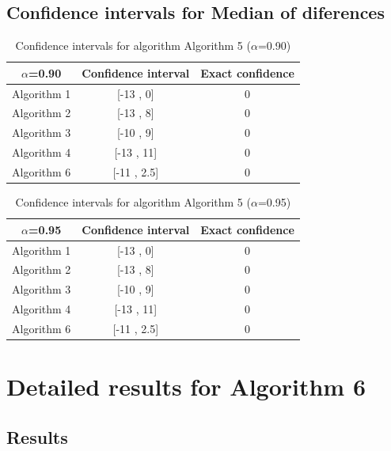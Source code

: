 \documentclass[a4paper,10pt]{article}
\begin{document}
\subsection{Confidence intervals for Median of diferences}

\begin{table}[!htp]
\centering\small
\begin{tabular}{
|c|c|c|}
\hline
 $\alpha$=0.90 & Confidence interval & Exact confidence \\ \hline 
Algorithm 1 & [-13 , 0] & 0\\ \hline 
Algorithm 2 & [-13 , 8] & 0\\ \hline 
Algorithm 3 & [-10 , 9] & 0\\ \hline 
Algorithm 4 & [-13 , 11] & 0\\ \hline 
Algorithm 6 & [-11 , 2.5] & 0\\ \hline 

\end{tabular}
\caption{Confidence intervals for algorithm Algorithm 5 ($\alpha$=0.90)}
\end{table}
\begin{table}[!htp]
\centering\small
\begin{tabular}{
|c|c|c|}
\hline
 $\alpha$=0.95 & Confidence interval & Exact confidence \\ \hline 
Algorithm 1 & [-13 , 0] & 0\\ \hline 
Algorithm 2 & [-13 , 8] & 0\\ \hline 
Algorithm 3 & [-10 , 9] & 0\\ \hline 
Algorithm 4 & [-13 , 11] & 0\\ \hline 
Algorithm 6 & [-11 , 2.5] & 0\\ \hline 

\end{tabular}
\caption{Confidence intervals for algorithm Algorithm 5 ($\alpha$=0.95)}
\end{table}

 \clearpage 


\section{Detailed results for Algorithm 6}


\subsection{Results}
\end{document}
